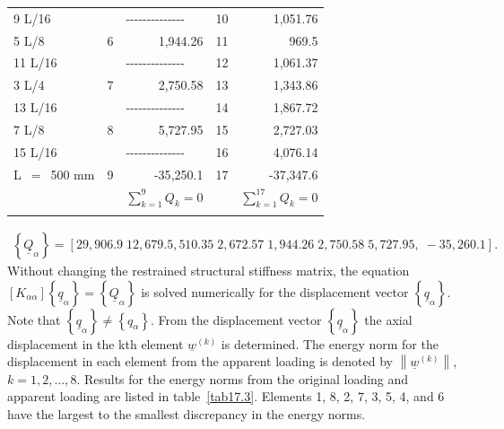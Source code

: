 \documentclass{AeroStructure-ERJohnson}
\begin{document}
\begin{table}[!h]
{\begin{tabular}{@{\extracolsep\fill}lcd{7,3}d{2,0}d{3,4}@{\extracolsep\fill}}
9 L/16 &  &   &  10 &  1{,}051.76\\
5 L/8 &  6 &  1{,}944.26 &  11 &  969.5\\
11 L/16 &  &   &  12 &  1{,}061.37\\
3 L/4 &  7  & 2{,}750.58 &  13 &  1{,}343.86\\
13 L/16 &  &   &  14 &  1{,}867.72\\
7 L/8 &  8  & 5{,}727.95 &  15 &  2{,}727.03\\
15 L/16 &  &   &  16 &  4{,}076.14\\
L~$=$~500 mm &  9 & -35{,}250.1 &  17 &  -37{,}347.6\\
\midrule
  & &   &  &  \\
\botrule
\end{tabular}}{}
\vspace*{-18pt}
\end{table}
\begin{align}\label{eq17.48}
\left\{\underline{Q}_{\alpha}\right\}=[29,906.9\;12,679.5,510.35\;2,672.57\;1,944.26\;2,750.58\;5,727.95,\;-35,260.1].
\end{align}
\noindent Without changing the restrained structural stiffness matrix, the equation $\left[K_{\alpha \alpha}\right]\left\{\underline{q}_{\alpha}\right\}=\left\{\underline{Q}_{\alpha}\right\}$ is solved numerically for the displacement vector $\left\{\underline{q}_{\alpha}\right\}$. Note that $\left\{\underline{q}_{\alpha}\right\} \neq\left\{q_{\alpha}\right\}$. From the displacement vector $\left\{\underline{q}_{\alpha}\right\}$ the axial displacement in the kth element $\underline{w}^{(k)}$ is determined. The energy norm for the displacement in each element from the apparent loading is denoted by $\left\|\underline{w}^{(k)}\right\|$, $k=1,2, \ldots, 8$. Results for the energy norms from the original loading and apparent loading are listed in table~\ref{tab17.3}. Elements 1, 8, 2, 7, 3, 5, 4, and 6 have the largest to the smallest discrepancy in the energy norms.
\end{document}
